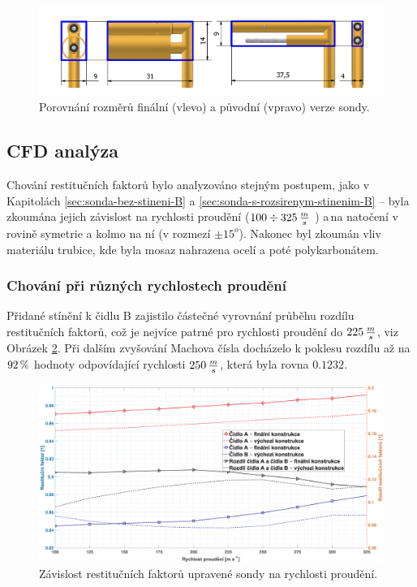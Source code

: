         

        \begin{figure}[ht!]
            \centering
            \includegraphics[width=\textwidth]{500_FINAL/porovnani_v01_final.png}
            \caption{Porovnání rozměrů finální (vlevo) a původní (vpravo) verze sondy.}
            \label{fig:sonda-final-porovnani}
        \end{figure}
        
    \subsection{CFD analýza}
        Chování restitučních faktorů bylo analyzováno stejným postupem, jako v Kapitolách \ref{sec:sonda-bez-stineni-B} a \ref{sec:sonda-s-rozsirenym-stinenim-B} – byla zkoumána jejich závislost na rychlosti proudění ($100 \div 325 \, \frac{m}{s}$ ) a\,na natočení v rovině symetrie a kolmo na ní (v rozmezí $\pm 15^o$). Nakonec byl zkoumán vliv materiálu trubice, kde byla mosaz nahrazena ocelí a poté polykarbonátem.
        \subsubsection{Chování při různých rychlostech proudění}
            Přidané stínění k čidlu B zajistilo částečné vyrovnání průběhu rozdílu restitučních faktorů, což je nejvíce patrné pro rychlosti proudění do $225 \, \frac{m}{s}$, viz Obrázek \ref{fig:sonda-final-rychlosti}. Při dalším zvyšování Machova čísla docházelo k poklesu rozdílu až na $92 \, \%$ hodnoty odpovídající rychlosti $250 \, \frac{m}{s}$, která byla rovna $0.1232$. 
            \begin{figure}[ht!]
                \centering
                \includegraphics*[width=\textwidth]{500_FINAL/final_rychlosti.eps}
                \caption{Závislost restitučních faktorů upravené sondy na rychlosti proudění.}
                \label{fig:sonda-final-rychlosti}
            \end{figure}

